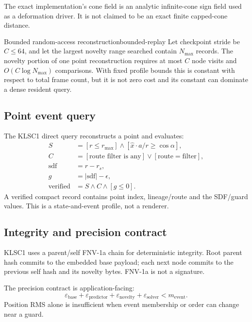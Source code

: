\documentclass[10pt,a4paper]{article}
\begin{document}
The exact implementation’s cone field is an analytic infinite-cone sign field used as a deformation driver. It is not claimed to be an exact finite capped-cone distance.

\begin{proposition}{Bounded random-access reconstruction}{bounded-replay}
Let checkpoint stride be \(C\le64\), and let the largest novelty range searched contain \(N_{\max}\) records. The novelty portion of one point reconstruction requires at most \(C\) node visits and \(O(C\log N_{\max})\) comparisons. With fixed profile bounds this is constant with respect to total frame count, but it is not zero cost and its constant can dominate a dense resident query.
\end{proposition}

\subsection{Point event query}

The KLSC1 direct query reconstructs a point and evaluates:
\[
\begin{aligned}
S &= [r\le r_{\max}]\wedge[\widehat x\cdot a/r\ge\cos\alpha],\\
C &= [\text{route filter is any}]\vee[\text{route}=\text{filter}],\\
\mathrm{sdf} &= r-r_s,\\
g &= |\mathrm{sdf}|-\epsilon,\\
\mathrm{verified} &= S\wedge C\wedge[g\le0].
\end{aligned}
\]
A verified compact record contains point index, lineage/route and the SDF/guard values. This is a state-and-event profile, not a renderer.

\subsection{Integrity and precision contract}

KLSC1 uses a parent/self FNV-1a chain for deterministic integrity. Root parent hash commits to the embedded base payload; each next node commits to the previous self hash and its novelty bytes. FNV-1a is not a signature.

The precision contract is application-facing:
\[
\varepsilon_{\mathrm{base}}+\varepsilon_{\mathrm{predictor}}+
\varepsilon_{\mathrm{novelty}}+\varepsilon_{\mathrm{solver}}
<m_{\mathrm{event}}.
\]
Position RMS alone is insufficient when event membership or order can change near a guard.
\end{document}
